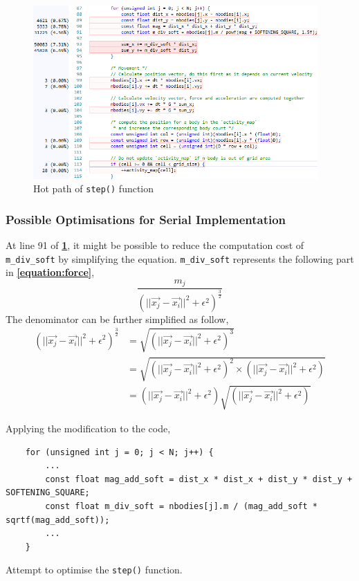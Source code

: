 \documentclass[12pt, a4paper]{article}
\let\oldcref\cref
\renewcommand{\cref}[1]{\textbf{\oldcref{#1}}}
\begin{document}
\begin{figure}[H]
  \centering
  \includegraphics[width=0.97\textwidth]{images/hotpath_step.png}
  \caption{Hot path of \texttt{step()} function}
  \label{fig:hotpath_step}
\end{figure}

\subsubsection{Possible Optimisations for Serial Implementation} \label{subsec:serial_optimisation}
At line 91 of \cref{fig:hotpath_step}, it might be possible to reduce the computation cost of
\texttt{m\_div\_soft} by simplifying the equation. \texttt{m\_div\_soft} represents the following
part in \cref{equation:force},
\begin{equation*}
  \frac{m_j}{(||\vec{x_j} - \vec{x_i}||^2 + \epsilon^2)^\frac{3}{2}}
\end{equation*}
The denominator can be further simplified as follow,
\begin{equation*}
  \begin{aligned}
    (||\vec{x_j} - \vec{x_i}||^2 + \epsilon^2)^\frac{3}{2} &= \sqrt{(||\vec{x_j} - \vec{x_i}||^2 + \epsilon^2)^3} \\
    &= \sqrt{(||\vec{x_j} - \vec{x_i}||^2 + \epsilon^2)^2 \times (||\vec{x_j} - \vec{x_i}||^2 + \epsilon^2)} \\
    &= (||\vec{x_j} - \vec{x_i}||^2 + \epsilon^2)\sqrt{(||\vec{x_j} - \vec{x_i}||^2 + \epsilon^2)}
  \end{aligned}
\end{equation*}

Applying the modification to the code,
\begin{listing}[H]
  \begin{verbatim}
    for (unsigned int j = 0; j < N; j++) {
        ...
        const float mag_add_soft = dist_x * dist_x + dist_y * dist_y + SOFTENING_SQUARE;
        const float m_div_soft = nbodies[j].m / (mag_add_soft * sqrtf(mag_add_soft));
        ...
    }
  \end{verbatim}
  \caption{Attempt to optimise the \texttt{step()} function.}
  \label{listing:serial_optimisaton_attempt}
\end{listing}
\end{document}
